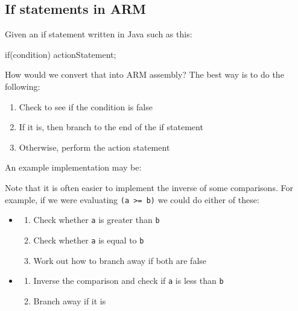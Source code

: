 \documentclass{article}
\begin{document}
\subsection{If statements in ARM}

Given an if statement written in Java such as this:

\begin{listing}{1}
if(condition)
{
    actionStatement;
}
\end{listing}

How would we convert that into ARM assembly? The best way is to do the following:

\begin{enumerate}

	\item Check to see if the condition is false

	\item If it is, then branch to the end of the if statement

	\item Otherwise, perform the action statement

\end{enumerate}

An example implementation may be:


Note that it is often easier to implement the inverse of some comparisons. For example, if we were evaluating {\tt (a >= b)} we could do either of these:

\begin{itemize}
	\item 
	\begin{enumerate}
		\item Check whether {\tt a} is greater than {\tt b}
		\item Check whether {\tt a} is equal to {\tt b}
		\item Work out how to branch away if both are false
	\end{enumerate}
	\item 
	\begin{enumerate}
		\item Inverse the comparison and check if {\tt a} is less than {\tt b}
		\item Branch away if it is
	\end{enumerate}
\end{itemize}
\end{document}
